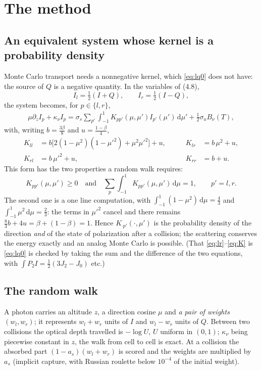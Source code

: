 \documentclass[11pt,a4paper]{article}
\renewcommand{\d}{\,\mathrm{d}}
\begin{document}
\section{The method}

\subsection{An equivalent system whose kernel is a probability density}
Monte Carlo transport \cite{hammersley,spanier,marchuk,mayer} needs a nonnegative kernel,
which \eqref{eq:lq0} does not have: the source of
$Q$ is a negative quantity. In the variables of (4.8),
\[
I_l=\tfrac12(I+Q),\qquad I_r=\tfrac12(I-Q),
\]
the system becomes, for $p\in\{l,r\}$,
\begin{align}\label{eq:lr}
\mu\partial_z I_p+\kappa_\nu I_p=\sigma_s\sum_{p'}\int_{-1}^1K_{pp'}(\mu,\mu')I_{p'}(\mu')\d\mu'
+\tfrac12\sigma_aB_\nu(T),
\end{align}
with, writing $b=\tfrac{3\beta}8$ and $u=\tfrac{1-\beta}4$,
\begin{equation}\label{eq:K}
\begin{aligned}
K_{ll}&=b\big[2(1-\mu^2)(1-\mu'^2)+\mu^2\mu'^2\big]+u, &\qquad K_{lr}&=b\,\mu^2+u,\\
K_{rl}&=b\,\mu'^2+u,&\qquad K_{rr}&=b+u .
\end{aligned}
\end{equation}
This form has the two properties a random walk requires:
\begin{equation}\label{eq:proba}
K_{pp'}(\mu,\mu')\ge0 \quad\text{and}\quad
\sum_{p}\int_{-1}^1K_{pp'}(\mu,\mu')\d\mu=1,\qquad p'=l,r .
\end{equation}
The second one is a one line computation, with $\int_{-1}^1(1-\mu^2)\d\mu=\frac43$ and
$\int_{-1}^1\mu^2\d\mu=\frac23$: the terms in $\mu'^2$ cancel and there remains
$\frac83b+4u=\beta+(1-\beta)=1$. Hence $K_{\cdot p'}(\cdot,\mu')$ is the probability
density of the direction \emph{and} of the state of polarization after a collision; the
scattering conserves the energy exactly and an analog Monte Carlo is possible. (That
\eqref{eq:lr}--\eqref{eq:K} is \eqref{eq:lq0} is checked by taking the sum and the
difference of the two equations, with $\int P_2I=\frac12(3J_2-J_0)$ etc.)

\subsection{The random walk}
A photon carries an altitude $z$, a direction cosine $\mu$ and \emph{a pair of weights}
$(w_l,w_r)$; it represents $w_l+w_r$ units of $I$ and $w_l-w_r$ units of $Q$. Between two
collisions the optical depth travelled is $-\log U$, $U$ uniform in $(0,1)$; $\kappa_\nu$
being piecewise constant in $z$, the walk from cell to cell is exact. At a collision the
absorbed part $(1-a_s)(w_l+w_r)$ is scored and the weights are multiplied by $a_s$
(implicit capture, with Russian roulette below $10^{-4}$ of the initial weight).
\end{document}
